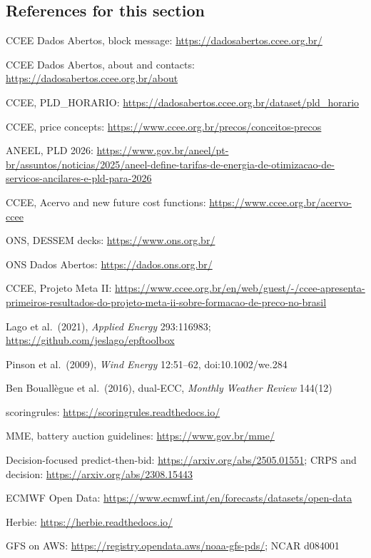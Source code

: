 \subsection*{References for this section}
{\small
\begin{enumerate}[label={[\arabic*]},leftmargin=2.2em,itemsep=1pt]
\item CCEE Dados Abertos, block message: \url{https://dadosabertos.ccee.org.br/}
\item CCEE Dados Abertos, about and contacts: \url{https://dadosabertos.ccee.org.br/about}
\item CCEE, PLD\_HORARIO: \url{https://dadosabertos.ccee.org.br/dataset/pld_horario}
\item CCEE, price concepts: \url{https://www.ccee.org.br/precos/conceitos-precos}
\item ANEEL, PLD 2026: \url{https://www.gov.br/aneel/pt-br/assuntos/noticias/2025/aneel-define-tarifas-de-energia-de-otimizacao-de-servicos-ancilares-e-pld-para-2026}
\item CCEE, Acervo and new future cost functions: \url{https://www.ccee.org.br/acervo-ccee}
\item ONS, DESSEM decks: \url{https://www.ons.org.br/}
\item ONS Dados Abertos: \url{https://dados.ons.org.br/}
\item CCEE, Projeto Meta II: \url{https://www.ccee.org.br/en/web/guest/-/ccee-apresenta-primeiros-resultados-do-projeto-meta-ii-sobre-formacao-de-preco-no-brasil}
\item Lago et al.\ (2021), \emph{Applied Energy} 293:116983; \url{https://github.com/jeslago/epftoolbox}
\item Pinson et al.\ (2009), \emph{Wind Energy} 12:51--62, doi:10.1002/we.284
\item Ben Bouallègue et al.\ (2016), dual-ECC, \emph{Monthly Weather Review} 144(12)
\item scoringrules: \url{https://scoringrules.readthedocs.io/}
\item MME, battery auction guidelines: \url{https://www.gov.br/mme/}
\item Decision-focused predict-then-bid: \url{https://arxiv.org/abs/2505.01551}; CRPS and decision: \url{https://arxiv.org/abs/2308.15443}
\item ECMWF Open Data: \url{https://www.ecmwf.int/en/forecasts/datasets/open-data}
\item Herbie: \url{https://herbie.readthedocs.io/}
\item GFS on AWS: \url{https://registry.opendata.aws/noaa-gfs-pds/}; NCAR d084001

\end{enumerate}}
